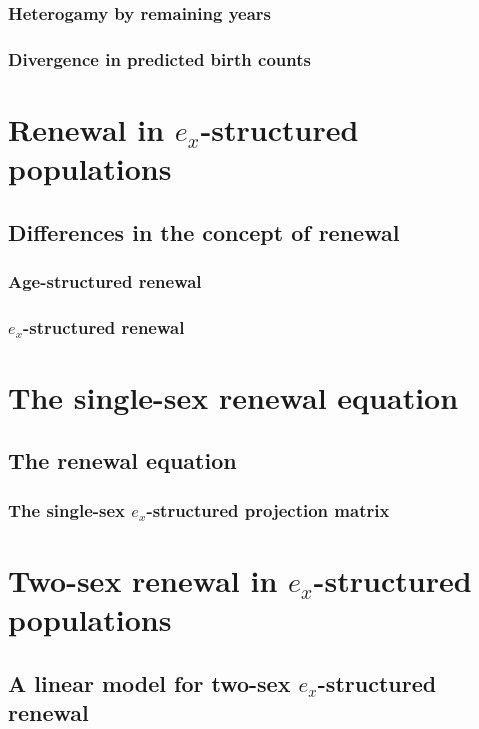     \subsection{Heterogamy by remaining years}

    \subsection{Divergence in predicted birth counts}
      
\chapter{Renewal in $e_x$-structured populations}

  \section{Differences in the concept of renewal}
  
    \subsection{Age-structured renewal}
    
    \subsection{$e_x$-structured renewal}
    
\chapter{The single-sex renewal equation}
    \section{The renewal equation}
    
    
    
    \subsection{The single-sex $e_x$-structured projection matrix}
      

\chapter{Two-sex renewal in $e_x$-structured populations}

  \section{A linear model for two-sex $e_x$-structured renewal}
